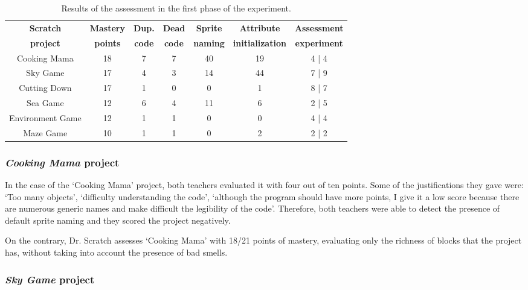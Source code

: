 \begin{table}
    \centering
    \begin{tabular}{|c|c|c|c|c|c|c|}
        \hline
        \textbf{Scratch} & \textbf{Mastery} & \textbf{Dup.} & \textbf{Dead} & \textbf{Sprite} & \textbf{Attribute} & \textbf{Assessment} \\ 
        \textbf{project} & \textbf{points} & \textbf{code} & \textbf{code} & \textbf{naming} & \textbf{initialization} & \textbf{experiment} \\ \hline
        Cooking Mama & 18 & 7 & 7 & 40 & 19 & 4 | 4 \\ \hline
        Sky Game & 17 & 4 & 3 & 14 & 44 & 7 | 9 \\ \hline
        Cutting Down & 17 & 1 & 0 & 0 & 1 & 8 | 7 \\ \hline
        Sea Game & 12 & 6 & 4 & 11 & 6 & 2 | 5 \\ \hline
        Environment Game & 12 & 1 & 1 & 0 & 0 & 4 | 4 \\ \hline
        Maze Game & 10 & 1 & 1 & 0 & 2 & 2 | 2 \\ \hline
    \end{tabular}
    \caption{Results of the assessment in the first phase of the experiment.}
    \label{table:assessment_experiment_results_1}
\end{table}

\subsubsection{\textit{Cooking Mama} project}
\label{subsub:cooking_mama}

In the case of the `Cooking Mama' project, both teachers evaluated it with four out of ten points. Some of the justifications they gave were: `Too many objects', `difficulty understanding the code', `although the program should have more points, I give it a low score because there are numerous generic names and make difficult the legibility of the code'. Therefore, both teachers were able to detect the presence of default sprite naming and they scored the project negatively.

On the contrary, Dr. Scratch assesses `Cooking Mama' with 18/21 points of mastery, evaluating only the richness of blocks that the project has, without taking into account the presence of bad smells.

\subsubsection{\textit{Sky Game} project}
\label{subsub:sky_game}

